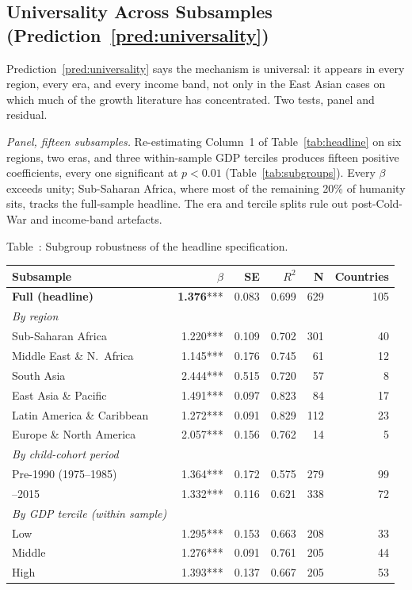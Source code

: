 \documentclass[12pt,letterpaper]{article}
\begin{document}
\subsection{Universality Across Subsamples (Prediction~\ref{pred:universality})}\label{policy-over-performers}

Prediction~\ref{pred:universality} says the mechanism is universal: it
appears in every region, every era, and every income band, not only in
the East Asian cases on which much of the growth literature has
concentrated. Two tests, panel and residual.

\emph{Panel, fifteen subsamples.} Re-estimating Column~1 of
Table~\ref{tab:headline} on six regions, two eras, and three within-sample
GDP terciles produces fifteen positive coefficients, every one
significant at $p<0.01$ (Table~\ref{tab:subgroups}). Every $\beta$
exceeds unity; Sub-Saharan Africa, where most of the remaining 20\%
of humanity sits, tracks the full-sample headline. The era and
tercile splits rule out post-Cold-War and income-band artefacts.

\label{tab:subgroups}Table~\thetable: Subgroup robustness of the headline specification.

\begin{longtable}[]{@{}lrrrrr@{}}
\toprule
Subsample & $\beta$ & SE & $R^2$ & N & Countries \\
\midrule
\endhead
\textbf{Full (headline)}         & \textbf{1.376}*** & 0.083 & 0.699 & 629 & 105 \\
\addlinespace
\emph{By region} & & & & & \\
\quad Sub-Saharan Africa         & 1.220*** & 0.109 & 0.702 & 301 &  40 \\
\quad Middle East \& N.~Africa   & 1.145*** & 0.176 & 0.745 &  61 &  12 \\
\quad South Asia                 & 2.444*** & 0.515 & 0.720 &  57 &   8 \\
\quad East Asia \& Pacific       & 1.491*** & 0.097 & 0.823 &  84 &  17 \\
\quad Latin America \& Caribbean & 1.272*** & 0.091 & 0.829 & 112 &  23 \\
\quad Europe \& North America    & 2.057*** & 0.156 & 0.762 &  14 &   5 \\
\addlinespace
\emph{By child-cohort period} & & & & & \\
\quad Pre-1990 (1975--1985)      & 1.364*** & 0.172 & 0.575 & 279 &  99 \\
\quad 1990--2015                 & 1.332*** & 0.116 & 0.621 & 338 &  72 \\
\addlinespace
\emph{By GDP tercile (within sample)} & & & & & \\
\quad Low                        & 1.295*** & 0.153 & 0.663 & 208 &  33 \\
\quad Middle                     & 1.276*** & 0.091 & 0.761 & 205 &  44 \\
\quad High                       & 1.393*** & 0.137 & 0.667 & 205 &  53 \\
\bottomrule
\end{longtable}
\end{document}
